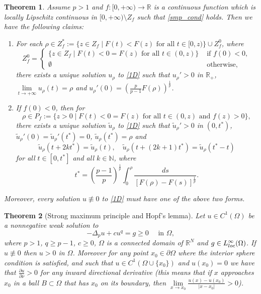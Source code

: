 \documentclass[10pt,a4paper]{amsart}
\newtheorem{theorem}{Theorem}
\begin{document}
	\begin{theorem}\label{th:1D}
		Assume $p>1$ and $f:[0,+\infty)\to\mathbb{R}$ is a continuous function which is locally Lipschitz continuous in $[0,+\infty)\setminus Z_f$ such that \eqref{smp_cond} holds. Then we have the following claims:
		\begin{enumerate}
			\item[(i)] For each $\rho\in Z_f^*:=\{z\in Z_f \mid F(t) < F(z) \text{ for all } t\in [0,z)\} \cup Z_f^0$, where			
			\[
			Z_f^0=
			\begin{cases}
				\{z\in Z_f \mid F(t) < 0 = F(z) \text{ for all } t\in (0,z)\} &\text{ if } f(0) < 0,\\
				\emptyset &\text{ otherwise},
			\end{cases}
			\]		
			there exists a unique solution $u_\rho$ to \eqref{1D} such that $u_\rho'>0$ in $\mathbb{R}_+$, $\lim\limits_{t\to+\infty} u_\rho(t)=\rho$ and $u_\rho'(0)=\left(\frac{p}{p-1}F(\rho)\right)^\frac{1}{p}$.
			\item[(ii)] If $f(0)<0$, then for
			\[
			\rho\in P_f := \{z>0 \mid F(t) < 0 = F(z) \text{ for all } t\in (0,z) \text{ and } f(z)>0\},
			\]
			there exists a unique solution $\tilde u_\rho$ to \eqref{1D} such that $\tilde u_\rho'>0$ in $(0,t^*)$, $\tilde u_\rho'(0)=\tilde u_\rho'(t^*)=0$, $\tilde u_\rho(t^*)=\rho$ and
			\[
			\tilde u_\rho(t+2kt^*)=\tilde u_\rho(t), \quad \tilde u_\rho(t+(2k+1)t^*)=\tilde u_\rho(t^*-t)
			\]
			for all $t\in[0,t^*]$ and all $k\in\mathbb{N}$,
			where
			\[
			t^* = \left(\frac{p-1}{p}\right)^\frac{1}{p}\int_{0}^{\rho} \frac{ds}{\left[F(\rho)-F(s)\right]^\frac{1}{p}}.
			\]
		\end{enumerate}
		
		Moreover, every solution $u \not\equiv 0$ to \eqref{1D} must have one of the above two forms.
	\end{theorem}

	\begin{theorem}[Strong maximum principle and Hopf's lemma]\label{th:smp}
		Let $u\in C^1(\Omega)$ be a nonnegative weak solution to
		\[
		-\Delta_p u + cu^q = g \ge 0 \quad\text{ in }\Omega,
		\]
		where $p>1$, $q\ge p-1$, $c\ge0$, $\Omega$ is a connected domain of $\mathbb{R}^N$ and $g \in L^\infty_{\rm loc}(\Omega)$. If $u \not\equiv 0$ then $u > 0$ in $\Omega$. Moreover for any point $x_0 \in \partial \Omega$ where the interior sphere condition is satisfied, and such that $u\in C^1(\Omega\cup\{x_0\})$ and $u(x_0) = 0$ we have that $\frac{\partial u}{\partial \nu}>0$ for any inward directional
		derivative (this means that if $x$ approaches $x_0$ in a ball $B\subset\Omega$
		that has $x_0$ on its boundary, then $\lim\limits_{x\to x_0} \frac{u(x)-u(x_0)}{|x-x_0|}>0$).
	\end{theorem}
\end{document}
